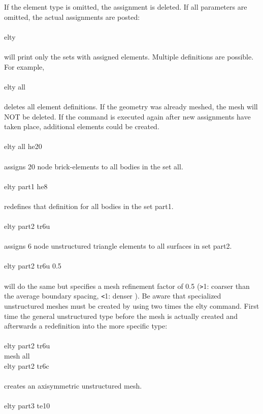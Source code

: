 \documentclass{article}
\begin{document}
If the element type is omitted, the assignment is deleted. If all parameters are 
omitted, the actual assignments are posted:\\\\
elty\\\\
will print only the sets with assigned elements. Multiple definitions are possible. For example,\\\\
elty all\\\\
deletes all element definitions. If the geometry was already meshed, the mesh will NOT be deleted. If the  command is executed again after new assignments have taken place, additional elements could be created.\\\\
elty all he20\\\\
assigns 20 node brick-elements to all bodies in the set all.\\\\
elty part1 he8\\\\
redefines that definition for all bodies in the set part1.\\\\
elty part2 tr6u\\\\
assigns 6 node unstructured triangle elements to all surfaces in set part2.\\\\
elty part2 tr6u 0.5\\\\
will do the same but specifies a mesh refinement factor of 0.5 (\verb_>_1: coarser than the average boundary spacing, \verb_<_1: denser ). Be aware that specialized unstructured meshes must be created by using two times the elty command. First time the general unstructured type before the mesh is actually created and afterwards a redefinition into the more specific type:\\\\
elty part2 tr6u\\
mesh all\\
elty part2 tr6c\\\\
creates an axisymmetric unstructured mesh.\\\\
elty part3 te10\\\\
\end{document}
